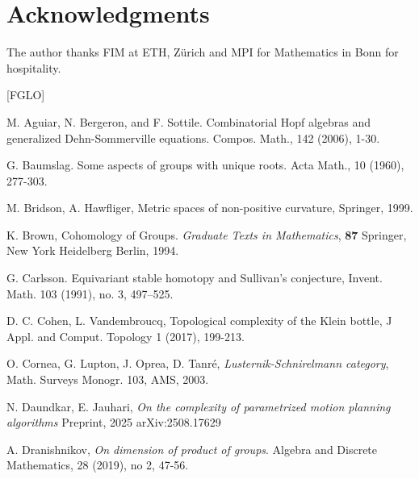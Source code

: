 \documentclass{amsart}
\numberwithin{equation}{section}
\theoremstyle{plain}
\theoremstyle{definition}
\begin{document}
\section{Acknowledgments} The author  thanks
FIM at ETH, Z\"urich and MPI for Mathematics in Bonn for hospitality. 



\begin{thebibliography}{[FGLO]}




 M. Aguiar, N. Bergeron, and F. Sottile. Combinatorial Hopf algebras and generalized Dehn-Sommerville
equations. Compos. Math., 142 (2006), 1-30.


 G. Baumslag. Some aspects of groups with unique roots. Acta Math., 10 (1960), 277-303.

 M. Bridson, A. Hawfliger, Metric spaces of non-positive curvature, Springer, 1999.
 
K. Brown, Cohomology of Groups. \emph{Graduate Texts in Mathematics},
\textbf{87} Springer, New York Heidelberg Berlin, 1994.

  G. Carlsson. Equivariant stable homotopy and Sullivan's conjecture, 
  Invent. Math. 103 (1991), no. 3, 497–525.

  D. C. Cohen, L. Vandembroucq, Topological complexity of the Klein bottle, J Appl. and Comput. Topology 1 (2017), 199-213.
  
 O. Cornea, G. Lupton, J. Oprea, D. Tanré, \emph{Lusternik-Schnirelmann category}, Math. Surveys Monogr. 103, AMS,  2003. 



 N. Daundkar, E. Jauhari, {\em On the complexity of parametrized motion planning algorithms} Preprint, 2025 arXiv:2508.17629

  A. Dranishnikov, {\em On dimension of product of groups}.  Algebra and Discrete Mathematics,  28  (2019), no 2,  47-56.



\end{thebibliography}
\end{document}
